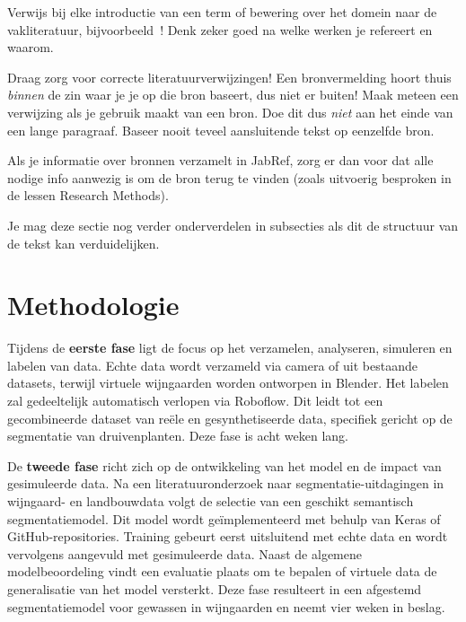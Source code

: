 Verwijs bij elke introductie van een term of bewering over het domein naar de vakliteratuur, bijvoorbeeld~\autocite{Hykes2013}! Denk zeker goed na welke werken je refereert en waarom.

Draag zorg voor correcte literatuurverwijzingen! Een bronvermelding hoort thuis \emph{binnen} de zin waar je je op die bron baseert, dus niet er buiten! Maak meteen een verwijzing als je gebruik maakt van een bron. Doe dit dus \emph{niet} aan het einde van een lange paragraaf. Baseer nooit teveel aansluitende tekst op eenzelfde bron.

Als je informatie over bronnen verzamelt in JabRef, zorg er dan voor dat alle nodige info aanwezig is om de bron terug te vinden (zoals uitvoerig besproken in de lessen Research Methods).


Je mag deze sectie nog verder onderverdelen in subsecties als dit de structuur van de tekst kan verduidelijken.

\section{Methodologie}%
\label{sec:methodologie}

Tijdens de \textbf{eerste fase} ligt de focus op het verzamelen, analyseren, simuleren en labelen van data. Echte data wordt verzameld via camera of uit bestaande datasets, terwijl virtuele wijngaarden worden ontworpen in Blender. Het labelen zal gedeeltelijk automatisch verlopen via Roboflow. Dit leidt tot een gecombineerde dataset van reële en gesynthetiseerde data, specifiek gericht op de segmentatie van druivenplanten. Deze fase is acht weken lang.

De \textbf{tweede fase} richt zich op de ontwikkeling van het model en de impact van gesimuleerde data. Na een literatuuronderzoek naar segmentatie-uitdagingen in wijngaard- en landbouwdata volgt de selectie van een geschikt semantisch segmentatiemodel. Dit model wordt geïmplementeerd met behulp van Keras of GitHub-repositories. Training gebeurt eerst uitsluitend met echte data en wordt vervolgens aangevuld met gesimuleerde data. Naast de algemene modelbeoordeling vindt een evaluatie plaats om te bepalen of virtuele data de generalisatie van het model versterkt. Deze fase resulteert in een afgestemd segmentatiemodel voor gewassen in wijngaarden en neemt vier weken in beslag.

